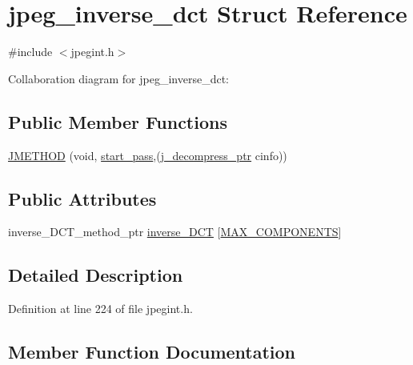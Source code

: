 \hypertarget{structjpeg__inverse__dct}{}\section{jpeg\+\_\+inverse\+\_\+dct Struct Reference}
\label{structjpeg__inverse__dct}


{\ttfamily \#include $<$jpegint.\+h$>$}



Collaboration diagram for jpeg\+\_\+inverse\+\_\+dct\+:
\subsection*{Public Member Functions}
\begin{DoxyCompactItemize}
\item 
\mbox{\hyperlink{structjpeg__inverse__dct_a2e9c37cdc48deba795ea5ede7834a3c0}{J\+M\+E\+T\+H\+OD}} (void, \mbox{\hyperlink{jddctmgr_8c_a1964f006adb8fb80f57e455f6452aec1}{start\+\_\+pass}},(\mbox{\hyperlink{jpeglib_8h_a00c7d78af44bd26a901c791ccfc1e178}{j\+\_\+decompress\+\_\+ptr}} cinfo))
\end{DoxyCompactItemize}
\subsection*{Public Attributes}
\begin{DoxyCompactItemize}
\item 
inverse\+\_\+\+D\+C\+T\+\_\+method\+\_\+ptr \mbox{\hyperlink{structjpeg__inverse__dct_aa05e35a50f28daf199d2efa702a72c2a}{inverse\+\_\+\+D\+CT}} \mbox{[}\mbox{\hyperlink{jmorecfg_8h_a6d8c910a1fdb6d4762a05f7250e64322}{M\+A\+X\+\_\+\+C\+O\+M\+P\+O\+N\+E\+N\+TS}}\mbox{]}
\end{DoxyCompactItemize}


\subsection{Detailed Description}


Definition at line 224 of file jpegint.\+h.



\subsection{Member Function Documentation}
\mbox{\label{structjpeg__inverse__dct_a2e9c37cdc48deba795ea5ede7834a3c0}} 
